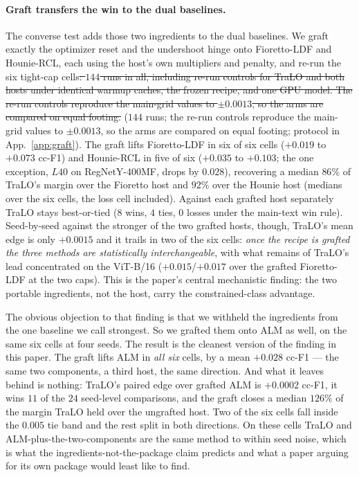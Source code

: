 \documentclass[10pt]{article}
\newcommand{\del}[1]{{\color{red}\sout{#1}}}
\begin{document}
\paragraph{Graft transfers the win to the dual baselines.}
The converse test adds those two ingredients to the dual baselines. We
graft exactly the optimizer reset and the undershoot hinge onto
Fioretto-LDF and Hounie-RCL, each using the host's own multipliers and
penalty, and re-run the six tight-cap cells\del{: $144$ runs in all, including
re-run controls for TraLO and both hosts under identical warmup caches,
the frozen recipe, and one GPU model. The re-run controls reproduce the
main-grid values to $\pm0.0013$, so the arms are compared on equal
footing.}{\color{blue} ($144$ runs; the re-run controls reproduce the main-grid
values to $\pm0.0013$, so the arms are compared on equal footing; protocol in
App.~\ref{app:graft}).} The graft lifts Fioretto-LDF in six of six cells ($+0.019$ to
$+0.073$ cc-F1) and Hounie-RCL in five of six ($+0.035$ to $+0.103$; the
one exception, $L40$ on RegNet{\color{blue}Y-400MF}, drops by $0.028$), recovering a median
$86\%$ of TraLO's margin over the Fioretto host and $92\%$ over the
Hounie host (medians over the six cells, the loss cell included). Against
each grafted host separately TraLO stays best-or-tied ($8$ wins, $4$
ties, $0$ losses under the main-text win rule). Seed-by-seed against the
stronger of the two grafted hosts, though, TraLO's mean edge is only
$+0.0015$ and it trails in two of the six cells: \emph{once the recipe is
grafted the three methods are statistically interchangeable}, with what
remains of TraLO's lead concentrated on the ViT-B/16 ($+0.015$/$+0.017$
over the grafted Fioretto-LDF at the two caps). This is the paper's
central mechanistic finding: the two portable ingredients, not the host,
carry the constrained-class advantage.

{\color{blue}
The obvious objection to that finding is that we withheld the ingredients from
the one baseline we call strongest. So we grafted them onto ALM as well, on the
same six cells at four seeds. The result is the cleanest version of the finding
in this paper. The graft lifts ALM in \emph{all six} cells, by a mean $+0.028$
cc-F1 --- the same two components, a third host, the same direction. And what it
leaves behind is nothing: TraLO's paired edge over grafted ALM is $+0.0002$
cc-F1, it wins $11$ of the $24$ seed-level comparisons, and the graft closes a
median $126\%$ of the margin TraLO held over the ungrafted host. Two of the six
cells fall inside the $0.005$ tie band and the rest split in both directions.
On these cells TraLO and ALM-plus-the-two-components are the same method to
within seed noise, which is what the ingredients-not-the-package claim predicts
and what a paper arguing for its own package would least like to find.}
\end{document}

